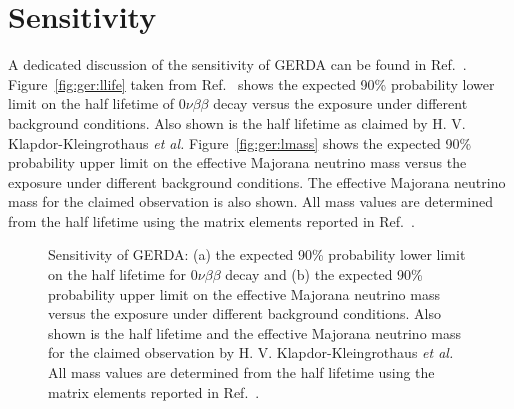 \section{Sensitivity}
\label{sec:gerda:sens}
A dedicated discussion of the sensitivity of GERDA can be found in Ref.~\cite{Cal06}. Figure~\ref{fig:ger:llife} taken from Ref.~\cite{Cal06} shows the expected 90\% probability lower limit on the half lifetime of $0\nu\beta\beta$ decay versus the exposure under different background conditions. Also shown is the half lifetime as claimed by H. V. Klapdor-Kleingrothaus \textit{et al.} \cite{Hei04} Figure~\ref{fig:ger:lmass} shows the expected 90\% probability upper limit on the effective Majorana neutrino mass versus the exposure under different background conditions. The effective Majorana neutrino mass for the claimed observation is also shown. All mass values are determined from the half lifetime using the matrix elements reported in Ref.~\cite{Rod07}.
\begin{figure}[tbhp]
\centering
{}\hfil%
%
\caption{Sensitivity of GERDA: (a) the expected 90\% probability lower limit on the half lifetime for $0\nu\beta\beta$ decay and (b) the expected 90\% probability upper limit on the effective Majorana neutrino mass versus the exposure under different background conditions.  Also shown is the half lifetime and the effective Majorana neutrino mass for the claimed observation by H. V. Klapdor-Kleingrothaus \textit{et al.} \cite{Hei04} All mass values are determined from the half lifetime using the matrix elements reported in Ref.~\cite{Rod07}.}
\label{fig:gerda:limit}
\end{figure}

